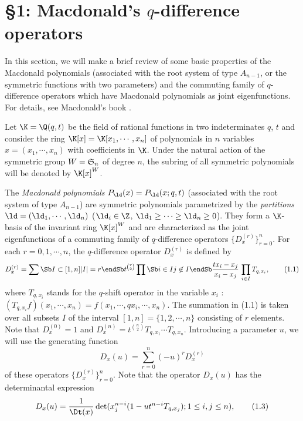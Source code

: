 \section{\S1:  Macdonald's $q$-difference operators}
%
In this section, we will make a brief review of some basic properties 
of the Macdonald polynomials (associated with the root system of type 
$A_{n-1}$, or the symmetric functions with two parameters) and 
the commuting family of $q$-difference operators
which have Macdonald polynomials as joint eigenfunctions.  
For details, see Macdonald's book \cite{Ma1}. 
\par\smallpagebreak\par
Let $\K=\Q(q,t)$ be the field of rational functions in two indeterminates 
$q$, $t$ 
and consider the ring $\K[x]=\K[x_1,\cdots,x_n]$ of polynomials in $n$ 
variables $x=(x_1,\cdots,x_n)$ with coefficients in $\K$.  
Under the natural action of the symmetric group $W=\frak{S}_n$ of 
degree $n$, the subring of all symmetric polynomials will be denoted 
by $\K[x]^{W}$. 
\par 
The {\it Macdonald polynomials} $P_{\ld}(x)=P_{\ld}(x;q,t)$ 
(associated with the root system of type $A_{n-1}$) 
are symmetric polynomials parametrized by the 
{\it partitions } $\ld=(\ld_1,\cdots,\ld_n)$
($\ld_i\in\Z$, $\ld_1\ge\cdots\ge\ld_n\ge0$).  
They form a $\K$-basis of the invariant ring $\K[x]^W$
and are characterized as the joint eigenfunctions 
of a commuting family of $q$-difference operators 
$\{D_x^{(r)}\}_{r=0}^n$. 
For each $r=0,1,\cdots,n$, the $q$-difference operator $D_x^{(r)}$ 
is defined by 
$$
D_x^{(r)}=\sum\Sb I\subset[1,n] \\ |I|=r \endSb t^{\binom{r}{2}}
\prod\Sb i\in I\\ j\not\in I\endSb 
\frac{tx_i-x_j}{x_i-x_j} \, \prod_{i\in I}T_{q,x_i}, 
\tag{1.1}
$$
where 
$T_{q,x_i}$ stands for the $q$-shift operator in the variable 
$x_i$ : 
$(T_{q,x_i}f)(x_1,\cdots,x_n)=f(x_1,\cdots,q x_i,\cdots,x_n)$. 
The summation in (1.1) is taken over all subsets $I$ of the interval 
$[1,n]=\{1,2,\cdots,n\}$ consisting of $r$ elements. 
Note that $D_x^{(0)}=1$ and 
$D_x^{(n)}=t^{\binom{n}{2}}T_{q,x_1}\cdots T_{q,x_n}$. 
Introducing a parameter $u$, we will use the generating function
$$
D_x(u)=\sum_{r=0}^n (-u)^r D_x^{(r)}
\tag{1.2} 
$$
of these operators $\{D_x^{(r)}\}_{r=0}^n$. 
Note that the operator $D_x(u)$ has the determinantal expression
$$
D_x(u)=\frac{1}{\Dt(x)}\det(x_j^{n-i}(1-ut^{n-i}T_{q,x_j}); 1\le i,j\le n),
\tag{1.3}
$$
